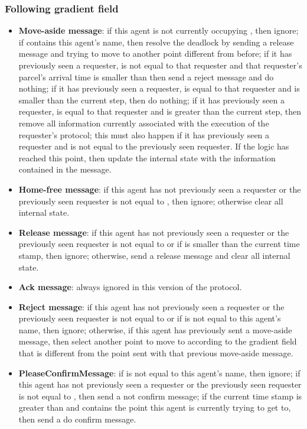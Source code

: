 \subsubsection*{Following gradient field}
\begin{itemize}
    \item \textbf{Move-aside message}: if this agent is not currently occupying , then ignore; if  contains this agent's name, then resolve the deadlock by sending a release message and trying to move to another point different from before; if it has previously seen a requester,  is not equal to that requester and that requester's parcel's arrival time is smaller than  then send a reject message and do nothing; if it has previously seen a requester,  is equal to that requester and  is smaller than the current step, then do nothing; if it has previously seen a requester,  is equal to that requester and  is greater than the current step, then remove all information currently associated with the execution of the requester's protocol; this must also happen if it has previously seen a requester and  is not equal to the previously seen requester. If the logic has reached this point, then update the internal state with the information contained in the message.
    \item \textbf{Home-free message}: if this agent has not previously seen a requester or the previously seen requester is not equal to , then ignore; otherwise clear all internal state.
    \item \textbf{Release message}: if this agent has not previously seen a requester or the previously seen requester is not equal to  or if  is smaller than the current time stamp, then ignore; otherwise, send a release message and clear all internal state.
    \item \textbf{Ack message}: always ignored in this version of the protocol.
    \item \textbf{Reject message}: if this agent has not previously seen a requester or the previously seen requester is not equal to  or if  is not equal to this agent's name, then ignore; otherwise, if this agent has previously sent a move-aside message, then select another point to move to according to the gradient field that is different from the point sent with that previous move-aside message.
    \item \textbf{PleaseConfirmMessage}: if  is not equal to this agent's name, then ignore; if this agent has not previously seen a requester or the previously seen requester is not equal to , then send a not confirm message; if the current time stamp is greater than  and  contains the point this agent is currently trying to get to, then send a do confirm message.

\end{itemize}
